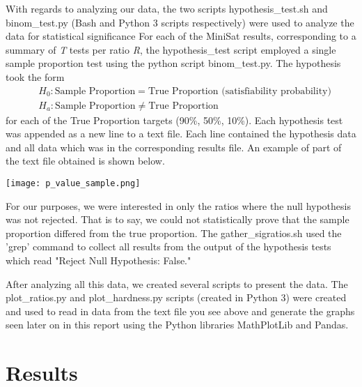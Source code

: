 \documentclass{eptcs}
\begin{document}
With regards to analyzing our data, the two scripts hypothesis\_test.sh and binom\_test.py (Bash and Python 3 scripts respectively) were used to analyze the data for statistical significance For each of the MiniSat results, corresponding to a summary of \textit{T} tests per ratio \textit{R}, the hypothesis\_test script employed a single sample proportion test using the python script binom\_test.py. The hypothesis took the form
\begin{align*}
&H_0: \text{Sample Proportion} = \text{True Proportion (satisfiability probability)}\\
&H_a: \text{Sample Proportion} \neq \text{True Proportion}
\end{align*}
for each of the True Proportion targets (90\%, 50\%, 10\%). Each hypothesis test was appended as a new line to a text file. Each line contained the hypothesis data and all data which was in the corresponding results file. An example of part of the text file obtained is shown below.
\begin{center}
	\centering
	\texttt{[image: p\_value\_sample.png]}
\end{center}

For our purposes, we were interested in only the ratios where the null hypothesis was not rejected. That is to say, we could not statistically prove that the sample proportion differed from the true proportion. The gather\_sigratios.sh used the 'grep' command to collect all results from the output of the hypothesis tests which read "Reject Null Hypothesis: False."

After analyzing all this data, we created several scripts to present the data. The plot\_ratios.py and plot\_hardness.py scripts (created in Python 3) were created and used to read in data from the text file you see above and generate the graphs seen later on in this report using the Python libraries MathPlotLib and Pandas.
\section*{Results}
\end{document}
